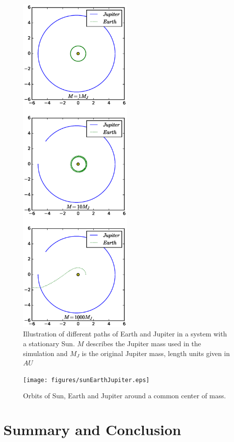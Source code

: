 \documentclass[twoside,twocolumn]{article}
\begin{document}
\begin{figure}[p]
\includegraphics[trim={0 2.5cm 0 2.5cm},width=0.5\textwidth, clip]{figures/earthJup.eps} 
		\caption{Illustration of different paths of Earth and Jupiter in a system with a stationary Sun. $M$ describes the Jupiter mass used in the simulation and $M_J$ is the original Jupiter mass, length units given in $AU$}\label{fig:jupiter_mass}
\end{figure}
\begin{figure}[p]
\texttt{[image: figures/sunEarthJupiter.eps]} 
		\caption{Orbits of Sun, Earth and Jupiter around a common center of mass.}\label{fig:total_momentum}
\end{figure}
\section{Summary and Conclusion}
\label{sec:conclusion}
	
	
	
\end{document}
